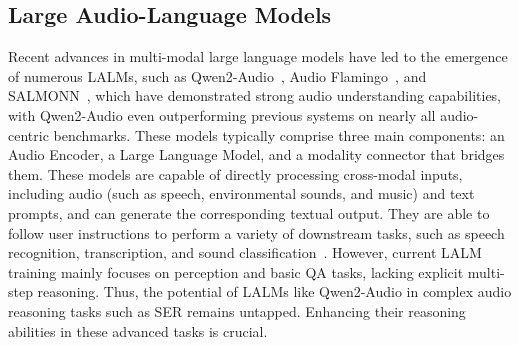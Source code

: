 \documentclass[11pt]{article}
\begin{document}
\subsection{Large Audio-Language Models}
Recent advances in multi-modal large language models have led to the emergence of numerous LALMs, such as Qwen2-Audio~\citep{chu2024qwen2}, Audio Flamingo~\citep{kong2024audio}, and SALMONN~\citep{tang2023salmonn}, which have demonstrated strong audio understanding capabilities, with Qwen2-Audio even outperforming previous systems on nearly all audio-centric benchmarks.
These models typically comprise three main components: an Audio Encoder, a Large Language Model, and a modality connector that bridges them.
These models are capable of directly processing cross-modal inputs, including audio (such as speech, environmental sounds, and music) and text prompts, and can generate the corresponding textual output. They are able to follow user instructions to perform a variety of downstream tasks, such as speech recognition, transcription, and sound classification~\citep{wang2025enabling, waheed2024speech}.
However, current LALM training mainly focuses on perception and basic QA tasks, lacking explicit multi-step reasoning. Thus, the potential of LALMs like Qwen2-Audio in complex audio reasoning tasks such as SER remains untapped. Enhancing their reasoning abilities in these advanced tasks is crucial.
\end{document}
